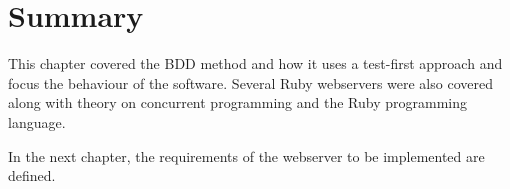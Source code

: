 \section{Summary}
This chapter covered the BDD method and how it uses a test-first approach
 and focus the behaviour of the software. Several Ruby webservers were
also covered along with theory on concurrent programming and the Ruby
programming language.

In the next chapter, the requirements of the webserver to be implemented are
defined.
